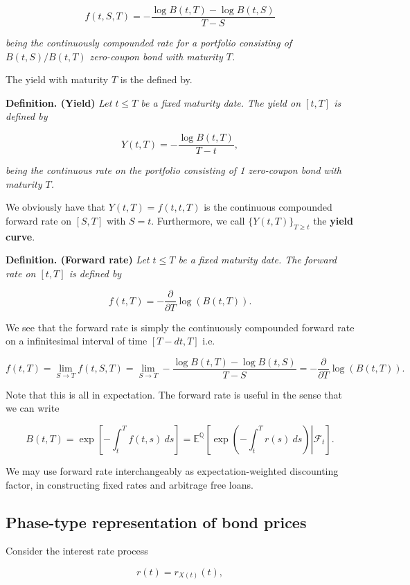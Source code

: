 \documentclass[
]{book}
\begin{document}
\[
f(t,S,T)=-\frac{\log B(t,T)-\log B(t,S)}{T-S}
\]

\emph{being the continuously compounded rate for a portfolio consisting of \(B(t,S)/B(t,T)\) zero-coupon bond with maturity \(T\).}

The yield with maturity \(T\) is the defined by.

\textbf{Definition. (Yield)} \emph{Let \(t\le T\) be a fixed maturity date. The yield on \([t,T]\) is defined by}

\[
Y(t,T)=-\frac{\log B(t,T)}{T-t},
\]

\emph{being the continuous rate on the portfolio consisting of 1 zero-coupon bond with maturity \(T\).}

We obviously have that \(Y(t,T)=f(t,t,T)\) is the continuous compounded forward rate on \([S,T]\) with \(S=t\). Furthermore, we call \(\{Y(t,T)\}_{T\ge t}\) the \textbf{yield curve}.

\textbf{Definition. (Forward rate)} \emph{Let \(t\le T\) be a fixed maturity date. The forward rate on \([t,T]\) is defined by}

\[
f(t,T)=-\frac{\partial}{\partial T}\log(B(t,T)).
\]

We see that the forward rate is simply the continuously compounded forward rate on a infinitesimal interval of time \([T-d t,T]\) i.e.

\[
f(t,T)=\lim_{S\to T}f(t,S,T)=\lim_{S\to T}-\frac{\log B(t,T)-\log B(t,S)}{T-S}=-\frac{\partial}{\partial T}\log(B(t,T)).
\]

Note that this is all in expectation. The forward rate is useful in the sense that we can write

\[
B(t,T)=\exp\left[-\int_t^T f(t,s)\ ds\right]=\mathbb E^{\mathbb Q}\left[\left.\exp\left(-\int_t^T r(s)\ ds\right) \right\vert \mathcal{F}_t\right].
\]

We may use forward rate interchangeably as expectation-weighted discounting factor, in constructing fixed rates and arbitrage free loans.

\hypertarget{phase-type-representation-of-bond-prices}{%
\subsection{Phase-type representation of bond prices}\label{phase-type-representation-of-bond-prices}}

Consider the interest rate process

\[
r(t)=r_{X(t)}(t),
\]
\end{document}
